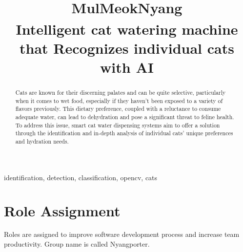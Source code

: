 \documentclass[conference]{IEEEtran}
\begin{document}
\title{MulMeokNyang\\
{\footnotesize \textsuperscript{}Intelligent cat watering machine that Recognizes individual cats with AI}
}

\author{
\and
{}
\and
{}
\and
{}
}

\maketitle

\begin{abstract}
Cats are known for their discerning palates and can be quite selective, particularly when it comes to wet food, especially if they haven't been exposed to a variety of flavors previously. This dietary preference, coupled with a reluctance to consume adequate water, can lead to dehydration and pose a significant threat to feline health. To address this issue, smart cat water dispensing systems aim to offer a solution through the identification and in-depth analysis of individual cats' unique preferences and hydration needs.
\end{abstract}

\begin{IEEEkeywords}
identification, detection, classification, opencv, cats
\end{IEEEkeywords}

\section{Role Assignment}
Roles are assigned to improve software development process and increase team productivity. Group name is called Nyangporter.
\newline
\end{document}
